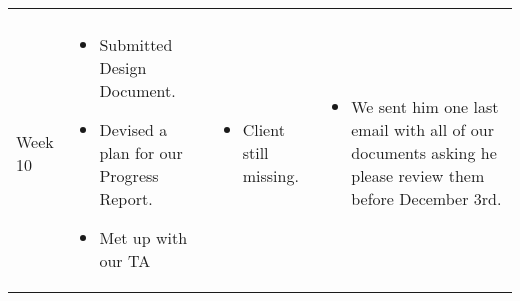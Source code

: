 \documentclass[onecolumn, draftclsnofoot,10pt, compsoc]{IEEEtran}
\begin{document}
\begin{longtable}{p{} | p{} | p{} | p{}}
\begin{itemize}
            \end{itemize}
        &
        \\Week 10
        &   \begin{itemize}
                \item Submitted Design Document.
                \item Devised a plan for our Progress Report.
                \item Met up with our TA
            \end{itemize}
        &   \begin{itemize}
                \item Client still missing.
            \end{itemize}
        &   \begin{itemize}
                \item We sent him one last email with all of our documents asking he please review them before December 3rd.
            \end{itemize}
    
    \end{longtable}



\end{document}
